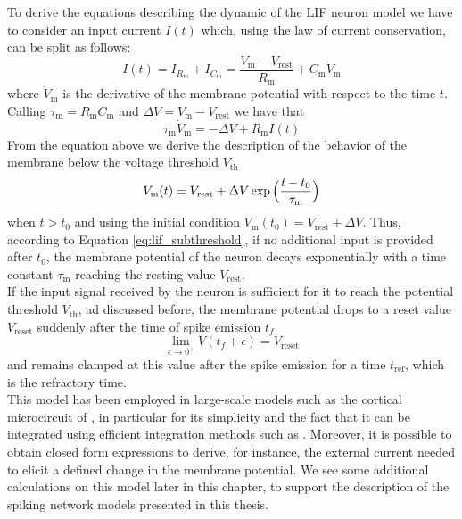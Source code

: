 \documentclass[a4paper, 12pt, twoside, openright]{book}
\begin{document}
To derive the equations describing the dynamic of the LIF neuron model we have to consider an input current $I(t)$ which, using the law of current conservation, can be split as follows:
\begin{equation}
    I(t) = I_{R_{\text{m}}} + I_{C_{\text{m}}} = \dfrac{V_{\text{m}} - V_{\text{rest}}}{R_{\text{m}}} + C_{\text{m}}\dot{V}_{\text{m}}
    \label{eq:lif_RC}
\end{equation}
where $\dot{V}_{\text{m}}$ is the derivative of the membrane potential with respect to the time $t$. Calling $\tau_{\text{m}}= R_{\text{m}} C_{\text{m}}$ and $\Delta V = V_{\text{m}} - V_{\text{rest}}$ we have that
\begin{equation}
    \tau_{\text{m}}\dot{V}_{\text{m}} = - \Delta V + R_{\text{m}} I(t)
\end{equation}
From the equation above we derive the description of the behavior of the membrane below the voltage threshold $V_{\text{th}}$
\begin{equation}
    V_{\text{m}}(t) = V_{\text{rest}} + \Delta V \exp{\Bigl( \frac{t-t_0}{\tau_{\text{m}}} \Bigr)}
    \label{eq:lif_subthreshold}
\end{equation}
when $t>t_0$ and using the initial condition $V_{\text{m}}(t_0) = V_{\text{rest}} + \Delta V$. Thus, according to Equation \eqref{eq:lif_subthreshold}, if no additional input is provided after $t_0$, the membrane potential of the neuron decays exponentially with a time constant $\tau_{\text{m}}$ reaching the resting value $V_{\text{rest}}$.\\
If the input signal received by the neuron is sufficient for it to reach the potential threshold $V_{\text{th}}$, ad discussed before, 
the membrane potential drops to a reset value $V_{\text{reset}}$ suddenly after the time of spike emission $t_{f}$
\begin{equation}
    \lim_{\epsilon \rightarrow 0^+} V(t_{f} + \epsilon) = V_{\text{reset}}
\end{equation}
and remains clamped at this value after the spike emission for a time $t_{\text{ref}}$, which is the refractory time.\\
This model has been employed in large-scale models such as the cortical microcircuit of \cite{Potjans2012}, in particular for its simplicity and the fact that it can be integrated using efficient integration methods such as \cite{Rotter1999}. Moreover, it is possible to obtain closed form expressions to derive, for instance, the external current needed to elicit a defined change in the membrane potential. We see some additional calculations on this model later in this chapter, to support the description of the spiking network models presented in this thesis.\\
\end{document}
